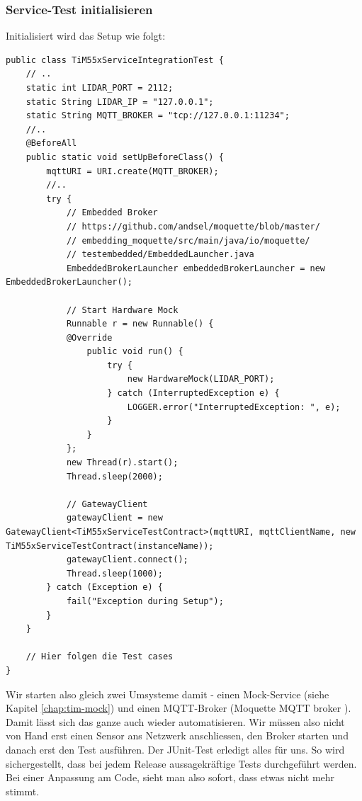 \subsubsection{Service-Test initialisieren}
Initialisiert wird das Setup wie folgt:
\begin{lstlisting}[caption={Service-Test Setup für den TiM55x-Service},label={lst:integrationstest-tim55x-setup}]
public class TiM55xServiceIntegrationTest {
    // ..
    static int LIDAR_PORT = 2112;
    static String LIDAR_IP = "127.0.0.1";
    static String MQTT_BROKER = "tcp://127.0.0.1:11234";
    //.. 
    @BeforeAll
    public static void setUpBeforeClass() {
        mqttURI = URI.create(MQTT_BROKER);
        //..
        try {
            // Embedded Broker
            // https://github.com/andsel/moquette/blob/master/
            // embedding_moquette/src/main/java/io/moquette/
            // testembedded/EmbeddedLauncher.java
            EmbeddedBrokerLauncher embeddedBrokerLauncher = new EmbeddedBrokerLauncher();

            // Start Hardware Mock
            Runnable r = new Runnable() {
            @Override
                public void run() {
                    try {
                        new HardwareMock(LIDAR_PORT);
                    } catch (InterruptedException e) {
                        LOGGER.error("InterruptedException: ", e);
                    }
                }
            };
            new Thread(r).start();
            Thread.sleep(2000);

            // GatewayClient
            gatewayClient = new GatewayClient<TiM55xServiceTestContract>(mqttURI, mqttClientName, new TiM55xServiceTestContract(instanceName));
            gatewayClient.connect();
            Thread.sleep(1000);
        } catch (Exception e) {
            fail("Exception during Setup");
        } 
    }
    
    // Hier folgen die Test cases
}
\end{lstlisting}
Wir starten also gleich zwei Umsysteme damit - einen Mock-Service (siehe Kapitel \ref{chap:tim-mock}) und einen MQTT-Broker (Moquette MQTT broker \cite{moquette-mqtt-broker}). Damit lässt sich das ganze auch wieder automatisieren. Wir müssen also nicht von Hand erst einen Sensor ans Netzwerk anschliessen, den Broker starten und danach erst den Test ausführen. Der JUnit-Test erledigt alles für uns. So wird sichergestellt, dass bei jedem Release aussagekräftige Tests durchgeführt werden. Bei einer Anpassung am Code, sieht man also sofort, dass etwas nicht mehr stimmt.

